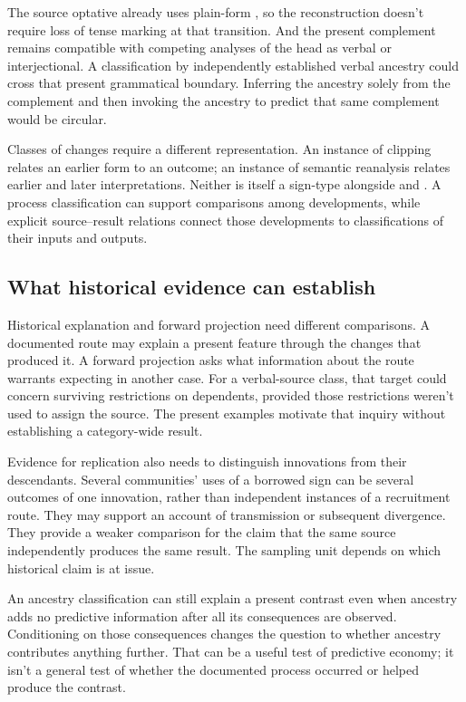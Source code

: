 \documentclass[12pt]{article}
\begin{document}
The source optative already uses plain-form , so the
reconstruction doesn't require loss of tense marking at that transition.
And the present complement remains compatible with competing analyses
of the head as verbal or interjectional. A classification by independently
established verbal ancestry could cross that present grammatical boundary.
Inferring the ancestry solely from the complement and then invoking
the ancestry to predict that same complement would be circular.

Classes of changes require a different representation. An instance of
clipping relates an earlier form to an outcome; an instance of semantic
reanalysis relates earlier and later interpretations. Neither is itself
a sign-type alongside  and . A process
classification can support comparisons among developments, while explicit
source--result relations connect those developments to classifications
of their inputs and outputs.

\subsection{What historical evidence can establish}

Historical explanation and forward projection need different comparisons.
A documented route may explain a present feature through the changes
that produced it. A forward projection asks what information about the
route warrants expecting in another case. For a verbal-source class,
that target could concern surviving restrictions on dependents, provided
those restrictions weren't used to assign the source. The present
examples motivate that inquiry without establishing a category-wide result.

Evidence for replication also needs to distinguish innovations from their
descendants. Several communities' uses of a borrowed sign can be
several outcomes of one innovation, rather than independent instances
of a recruitment route. They may support an account of transmission
or subsequent divergence. They provide a weaker comparison for the
claim that the same source independently produces the same result.
The sampling unit depends on which historical claim is at issue.

An ancestry classification can still explain a present contrast even
when ancestry adds no predictive information after all its consequences
are observed. Conditioning on those consequences changes the question
to whether ancestry contributes anything further. That can be a useful
test of predictive economy; it isn't a general test of whether the
documented process occurred or helped produce the contrast.
\end{document}

